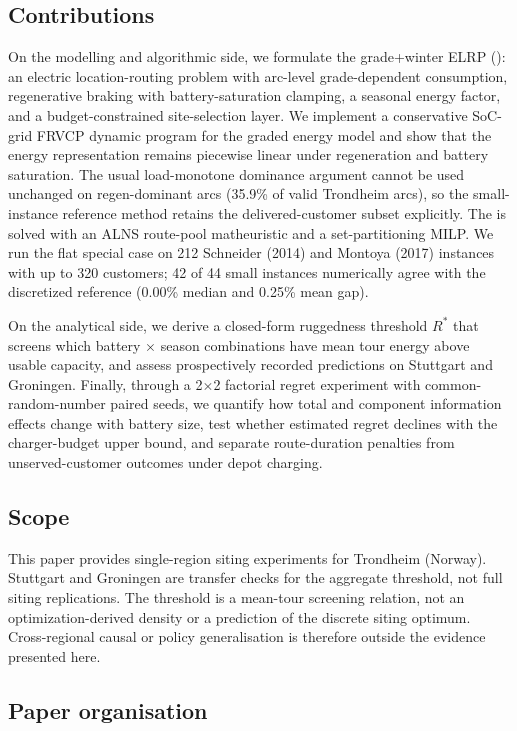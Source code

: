 \documentclass[review,3p,authoryear]{elsarticle}
\newcommand{\Rstar}{R^{*}}
\newcommand{\ELRP}{\text{GW-ELRP}}
\begin{document}
\subsection*{Contributions}

On the modelling and algorithmic side, we formulate the grade+winter
ELRP (\ELRP): an electric location-routing problem with
arc-level grade-dependent consumption, regenerative braking with
battery-saturation clamping, a seasonal energy factor, and a
budget-constrained site-selection layer.  We implement a conservative
SoC-grid FRVCP dynamic program for the graded energy model and show that
the energy representation remains piecewise linear under regeneration and
battery saturation.  The usual load-monotone dominance argument cannot be
used unchanged on regen-dominant arcs (35.9\% of valid Trondheim arcs), so
the small-instance reference method retains the delivered-customer subset
explicitly.  The \ELRP{} is solved with an ALNS route-pool matheuristic and
a set-partitioning MILP.  We run the flat special case on 212 Schneider
(2014) and Montoya (2017) instances with up to 320 customers; 42 of 44
small instances numerically agree with the discretized reference
(0.00\% median and 0.25\% mean gap).

On the analytical side, we derive a closed-form ruggedness threshold
$\Rstar$ that screens which battery $\times$ season combinations have mean
tour energy above usable capacity, and assess prospectively recorded
predictions on Stuttgart and Groningen.  Finally, through a
2$\times$2 factorial regret experiment with common-random-number paired
seeds, we quantify how total and component information effects change with
battery size, test whether estimated regret declines with the charger-budget
upper bound, and separate route-duration penalties from unserved-customer
outcomes under depot charging.

\subsection*{Scope}

This paper provides single-region siting experiments for Trondheim (Norway).
Stuttgart and Groningen are transfer checks for the aggregate threshold, not
full siting replications.  The threshold is a mean-tour screening relation,
not an optimization-derived density or a prediction of the discrete siting
optimum.  Cross-regional causal or policy generalisation is therefore outside
the evidence presented here.

\subsection*{Paper organisation}
\end{document}
